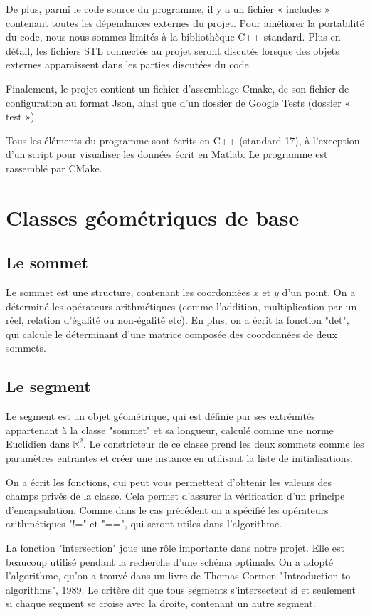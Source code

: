 \documentclass[12pt]{article}
\begin{document}
	De plus, parmi le code source du programme, il y a un fichier « includes » contenant toutes les dépendances externes du projet. Pour améliorer la portabilité du code, nous nous sommes limités à la bibliothèque C++ standard. Plus en détail, les fichiers STL connectés au projet seront discutés lorsque des objets externes apparaissent dans les parties discutées du code.
	
	Finalement, le projet contient un fichier d'assemblage Cmake, de son fichier de configuration au format Json, ainsi que d'un dossier de Google Tests (dossier « test »).
	
	Tous les éléments du programme sont écrits en C++ (standard 17), à l'exception d'un script pour visualiser les données écrit en Matlab. Le programme est rassemblé par CMake.
	\section{Classes géométriques de base}
	\subsection{Le sommet}
	Le sommet est une structure, contenant les coordonnées $x$ et $y$ d'un point. On a déterminé les opérateurs arithmétiques (comme l'addition, multiplication par un réel, relation d'égalité ou non-égalité etc). En plus, on a écrit la fonction "det", qui calcule le déterminant d'une matrice composée des coordonnées de deux sommets. 
	\subsection{Le segment}
	Le segment est un objet géométrique, qui est définie par ses extrémités appartenant à la classe "sommet" et sa longueur, calculé comme une norme Euclidien dans $\mathbb{R}^2$. Le constricteur  de ce classe prend les deux sommets comme les paramètres entrantes et créer une instance en utilisant la liste de initialisations.
	
	On a écrit les fonctions, qui peut vous permettent d'obtenir les valeurs des champs privés de la classe. Cela permet d'assurer la vérification d'un principe d'encapsulation. Comme dans le cas précédent on a spécifié les opérateurs arithmétiques "!=" et "==", qui seront utiles dans l'algorithme. 
	
	La fonction "intersection" joue une rôle importante dans notre projet. Elle est beaucoup utilisé pendant la recherche d'une schéma optimale. On a adopté l'algorithme, qu'on a trouvé dans un livre de Thomas Cormen "Introduction to algorithms", 1989. Le critère dit que tous segments s'intersectent si et seulement si chaque segment se croise avec la droite, contenant un autre segment.
	
\end{document}
